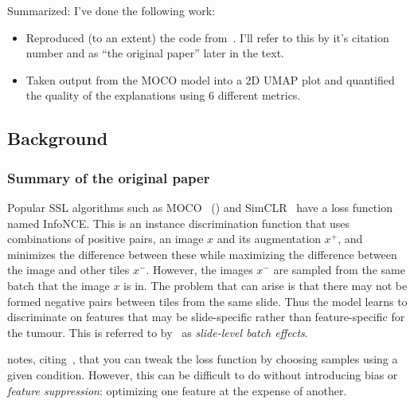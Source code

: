 \documentclass[10pt,twocolumn,letterpaper]{article}
\begin{document}
Summarized: I've done the following work:
\begin{itemize}
  \item Reproduced (to an extent) the code from~\cite{sslUMAP}. I'll refer to this by it's citation number and as ``the original paper'' later in the text.
  \item Taken output from the \gls{MOCO} model into a 2D \gls{UMAP} plot and quantified the quality of the explanations using 6 different metrics.
\end{itemize}


\subsection{Background}\label{sec:background}

\subsubsection{Summary of the original paper}
Popular \gls{SSL} algorithms such as \gls{MOCO}~\cite{moco} () and SimCLR~\cite{simCLR} have a loss function named \gls{InfoNCE}. This is an instance discrimination function that uses combinations of positive pairs, an image $x$ and its augmentation $x^{+}$, and minimizes the difference between these while maximizing the difference between the image and other tiles $x^{-}$. However, the images $x^{-}$ are sampled from the same batch that the image $x$ is in. The problem that can arise is that there may not be formed negative pairs between tiles from the same slide. Thus the model learns to discriminate on features that may be slide-specific rather than feature-specific for the tumour. This is referred to by~\cite{sslUMAP} as \textit{slide-level batch effects}.

\cite{sslUMAP} notes, citing~\cite{contrastiveShortcut}, that you can tweak the loss function by choosing samples using a given condition. However, this can be difficult to do without introducing bias or \textit{feature suppression}: optimizing one feature at the expense of another. 
\end{document}
